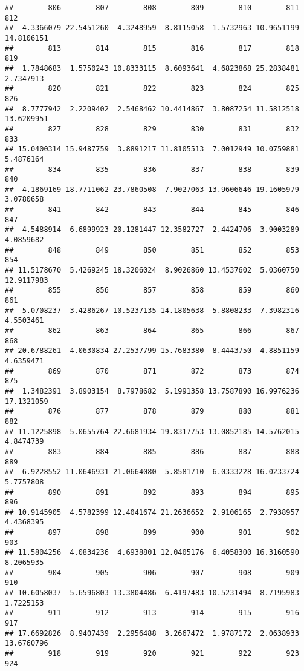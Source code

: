 \documentclass[
]{article}
\begin{document}
\begin{verbatim}
##        806        807        808        809        810        811        812 
##  4.3366079 22.5451260  4.3248959  8.8115058  1.5732963 10.9651199 14.8106151 
##        813        814        815        816        817        818        819 
##  1.7848683  1.5750243 10.8333115  8.6093641  4.6823868 25.2838481  2.7347913 
##        820        821        822        823        824        825        826 
##  8.7777942  2.2209402  2.5468462 10.4414867  3.8087254 11.5812518 13.6209951 
##        827        828        829        830        831        832        833 
## 15.0400314 15.9487759  3.8891217 11.8105513  7.0012949 10.0759881  5.4876164 
##        834        835        836        837        838        839        840 
##  4.1869169 18.7711062 23.7860508  7.9027063 13.9606646 19.1605979  3.0780658 
##        841        842        843        844        845        846        847 
##  4.5488914  6.6899923 20.1281447 12.3582727  2.4424706  3.9003289  4.0859682 
##        848        849        850        851        852        853        854 
## 11.5178670  5.4269245 18.3206024  8.9026860 13.4537602  5.0360750 12.9117983 
##        855        856        857        858        859        860        861 
##  5.0708237  3.4286267 10.5237135 14.1805638  5.8808233  7.3982316  4.5503461 
##        862        863        864        865        866        867        868 
## 20.6788261  4.0630834 27.2537799 15.7683380  8.4443750  4.8851159  4.6359471 
##        869        870        871        872        873        874        875 
##  1.3482391  3.8903154  8.7978682  5.1991358 13.7587890 16.9976236 17.1321059 
##        876        877        878        879        880        881        882 
## 11.1225898  5.0655764 22.6681934 19.8317753 13.0852185 14.5762015  4.8474739 
##        883        884        885        886        887        888        889 
##  6.9228552 11.0646931 21.0664080  5.8581710  6.0333228 16.0233724  5.7757808 
##        890        891        892        893        894        895        896 
## 10.9145905  4.5782399 12.4041674 21.2636652  2.9106165  2.7938957  4.4368395 
##        897        898        899        900        901        902        903 
## 11.5804256  4.0834236  4.6938801 12.0405176  6.4058300 16.3160590  8.2065935 
##        904        905        906        907        908        909        910 
## 10.6058037  5.6596803 13.3804486  6.4197483 10.5231494  8.7195983  1.7225153 
##        911        912        913        914        915        916        917 
## 17.6692826  8.9407439  2.2956488  3.2667472  1.9787172  2.0638933 13.6760796 
##        918        919        920        921        922        923        924 

\end{verbatim}
\end{document}

